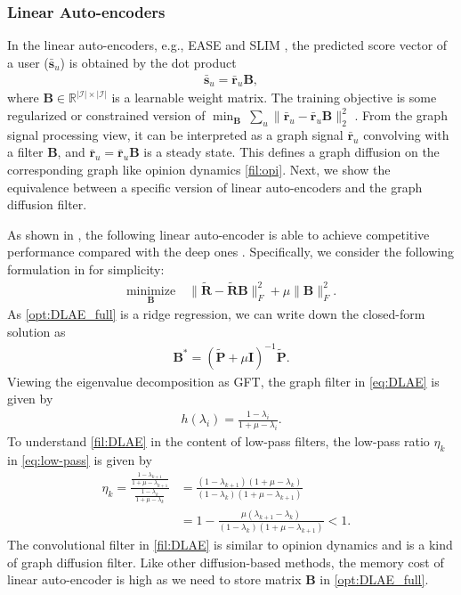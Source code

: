 \documentclass[sigconf]{acmart}
\begin{document}
\subsubsection{Linear Auto-encoders} In the linear auto-encoders, e.g., EASE \cite{steck2019embarrassingly} and SLIM \cite{ning2011slim}, the predicted score vector of a user ($\bar{\bm{s}}_u$) is obtained by the dot product
\begin{align*}
    \bar{\bm{s}}_{u} = \bar{\bm{r}}_u \bm{B},
\end{align*}
where $\bm{B} \in \mathbb{R}^{|\mathcal{I}| \times |\mathcal{I}|}$ is a learnable weight matrix. The training objective is some regularized or constrained version of $\min_{\bm{B}} \ \sum_u \|\bar{\bm{r}}_u - \bar{\bm{r}}_u \bm{B}\|_2^2$ . From the graph signal processing view, it can be interpreted as a graph signal $\bar{\bm{r}}_u$ convolving with a filter $\bm{B}$, and $\bar{\bm{r}}_u = \bar{\bm{r}}_u \bm{B}$ is a steady state. This defines a graph diffusion on the corresponding graph like opinion dynamics \eqref{fil:opi}. Next, we show the equivalence between a specific version of linear auto-encoders and the graph diffusion filter.

As shown in \cite{steck2020autoencoders}, the following linear auto-encoder is able to achieve competitive performance compared with the deep ones \cite{wu2016collaborative,liang2018variational}. Specifically, we consider the following formulation in \cite{steck2020autoencoders} for simplicity:
\begin{align} \label{opt:DLAE_full}
    \underset{\bm{B}}{\text{minimize}}\quad \|\tilde{\bm{R}} - \tilde{\bm{R}} \bm{B}\|_F^2 + \mu \|\bm{B}\|_F^2.
\end{align}
As \eqref{opt:DLAE_full} is a ridge regression, we can write down the closed-form solution as 
\begin{align} \label{eq:DLAE}
    \bm{B}^* = (\tilde{\bm{P}} + \mu \bm{I})^{-1} \tilde{\bm{P}}.
\end{align}
Viewing the eigenvalue decomposition as GFT, the graph filter in \eqref{eq:DLAE} is given by
\begin{align} \label{fil:DLAE}
    h(\lambda_i) = \frac{ 1 - \lambda_i}{ 1 + \mu - \lambda_i}.
\end{align}
To understand \eqref{fil:DLAE} in the content of low-pass filters, the low-pass ratio $\eta_k$ in \eqref{eq:low-pass} is given by
\begin{align*}
    \eta_k = \frac{\frac{1 - \lambda_{k+1} }{1 + \mu - \lambda_{k+1}}}{\frac{1 - \lambda_k}{1 + \mu - \lambda_k}} &= \frac{(1 - \lambda_{k+1})(1 + \mu - \lambda_k)}{(1 - \lambda_k)(1 + \mu - \lambda_{k+1})} & \\
    &= 1 - \frac{\mu(\lambda_{k+1} - \lambda_k)}{(1 - \lambda_k)(1 + \mu - \lambda_{k+1})} < 1.
\end{align*}
The convolutional filter in \eqref{fil:DLAE} is similar to opinion dynamics and is a kind of graph diffusion filter. Like other diffusion-based methods, the memory cost of linear auto-encoder is high as we need to store matrix $\bm{B}$ in \eqref{opt:DLAE_full}.
\end{document}
